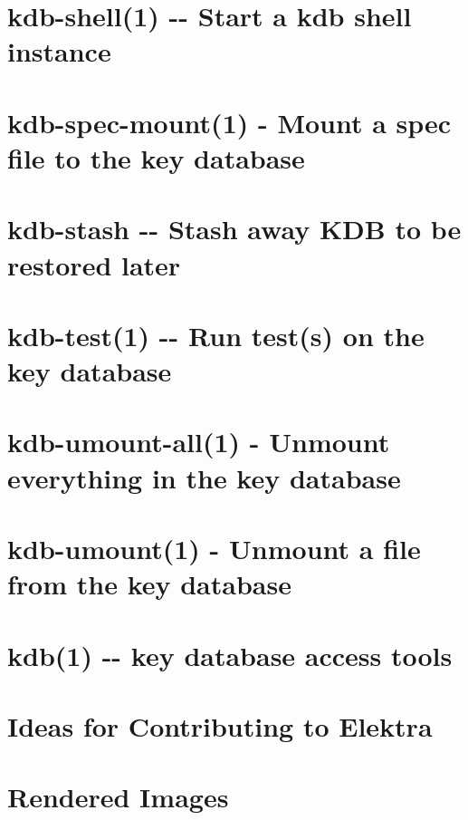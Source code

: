 \documentclass[twoside]{book}
\newcommand{\+}{\discretionary{\mbox{\scriptsize$\hookleftarrow$}}{}{}}
\begin{document}
\chapter{kdb-\/shell(1) -\/-\/ Start a kdb shell instance}
\label{doc_help_kdb-shell_md}

\chapter{kdb-\/spec-\/mount(1) -\/ Mount a spec file to the key database}
\label{doc_help_kdb-spec-mount_md}

\chapter{kdb-\/stash -\/-\/ Stash away K\+DB to be restored later}
\label{doc_help_kdb-stash_md}

\chapter{kdb-\/test(1) -\/-\/ Run test(s) on the key database}
\label{doc_help_kdb-test_md}

\chapter{kdb-\/umount-\/all(1) -\/ Unmount everything in the key database}
\label{doc_help_kdb-umount-all_md}

\chapter{kdb-\/umount(1) -\/ Unmount a file from the key database}
\label{doc_help_kdb-umount_md}

\chapter{kdb(1) -\/-\/ key database access tools}
\label{doc_help_kdb_md}

\chapter{Ideas for Contributing to Elektra}
\label{doc_IDEAS_md}

\chapter{Rendered Images}
\label{doc_images_README_md}

\end{document}
